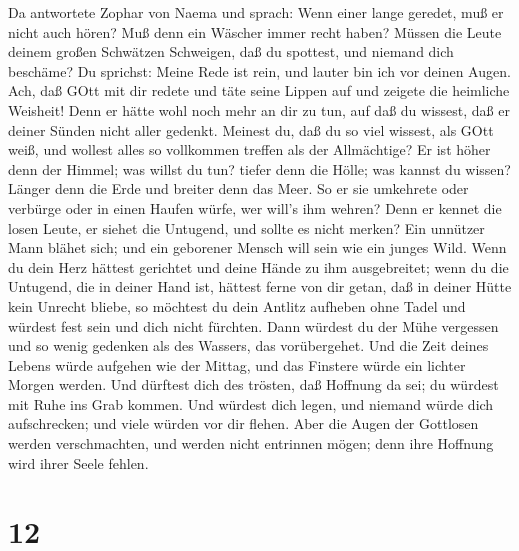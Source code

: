  Da antwortete Zophar von Naema und sprach: 
Wenn einer lange geredet, muß er nicht auch hören? Muß denn ein Wäscher
immer recht haben?  Müssen die Leute deinem großen Schwätzen
Schweigen, daß du spottest, und niemand dich beschäme?  Du
sprichst: Meine Rede ist rein, und lauter bin ich vor deinen Augen.
 Ach, daß GOtt mit dir redete und täte seine Lippen auf
 und zeigete die heimliche Weisheit! Denn er hätte wohl noch
mehr an dir zu tun, auf daß du wissest, daß er deiner Sünden nicht aller
gedenkt.  Meinest du, daß du so viel wissest, als GOtt weiß,
und wollest alles so vollkommen treffen als der Allmächtige?
 Er ist höher denn der Himmel; was willst du tun? tiefer
denn die Hölle; was kannst du wissen?  Länger denn die Erde
und breiter denn das Meer.  So er sie umkehrete oder
verbürge oder in einen Haufen würfe, wer will's ihm wehren?
 Denn er kennet die losen Leute, er siehet die Untugend,
und sollte es nicht merken?  Ein unnützer Mann blähet sich;
und ein geborener Mensch will sein wie ein junges Wild. 
Wenn du dein Herz hättest gerichtet und deine Hände zu ihm ausgebreitet;
 wenn du die Untugend, die in deiner Hand ist, hättest
ferne von dir getan, daß in deiner Hütte kein Unrecht bliebe,
 so möchtest du dein Antlitz aufheben ohne Tadel und
würdest fest sein und dich nicht fürchten.  Dann würdest du
der Mühe vergessen und so wenig gedenken als des Wassers, das
vorübergehet.  Und die Zeit deines Lebens würde aufgehen
wie der Mittag, und das Finstere würde ein lichter Morgen werden.
 Und dürftest dich des trösten, daß Hoffnung da sei; du
würdest mit Ruhe ins Grab kommen.  Und würdest dich legen,
und niemand würde dich aufschrecken; und viele würden vor dir flehen.
 Aber die Augen der Gottlosen werden verschmachten, und
werden nicht entrinnen mögen; denn ihre Hoffnung wird ihrer Seele
fehlen.

\hypertarget{section-11}{%
\section{12}\label{section-11}}

